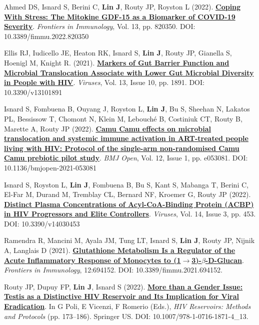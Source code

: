 \documentclass[letterpaper,11pt]{article}
\newcounter{journalCounter}
\newcommand{\jref}{%
    \stepcounter{journalCounter}%
    \textbf{[J.\thejournalCounter]}%
}
\begin{document}
\item[\jref] Ahmed DS, Isnard S, Berini C, \textbf{Lin J}, Routy JP, Royston L (2022). \href{https://doi.org/10.3389/fimmu.2022.820350}{\textbf{Coping With Stress: The Mitokine GDF-15 as a Biomarker of COVID-19 Severity}}. \textit{Frontiers in Immunology}, Vol. 13, pp. 820350. DOI: 10.3389/fimmu.2022.820350

\item[\jref] Ellis RJ, Iudicello JE, Heaton RK, Isnard S, \textbf{Lin J}, Routy JP, Gianella S, Hoenigl M, Knight R. (2021). \href{https://doi.org/10.3390/v13101891}{\textbf{Markers of Gut Barrier Function and Microbial Translocation Associate with Lower Gut Microbial Diversity in People with HIV}}. \textit{Viruses}, Vol. 13, Issue 10, pp. 1891. DOI: 10.3390/v13101891

\item[\jref] Isnard S, Fombuena B, Ouyang J, Royston L, \textbf{Lin J}, Bu S, Sheehan N, Lakatos PL, Bessissow T, Chomont N, Klein M, Lebouché B, Costiniuk CT, Routy B, Marette A, Routy JP (2022). \href{https://doi.org/10.1136/bmjopen-2021-053081}{\textbf{Camu Camu effects on microbial translocation and systemic immune activation in ART-treated people living with HIV: Protocol of the single-arm non-randomised Camu Camu prebiotic pilot study}}. \textit{BMJ Open}, Vol. 12, Issue 1, pp. e053081. DOI: 10.1136/bmjopen-2021-053081

\item[\jref] Isnard S, Royston L, \textbf{Lin J}, Fombuena B, Bu S, Kant S, Mabanga T, Berini C, El-Far M, Durand M, Tremblay CL, Bernard NF, Kroemer G, Routy JP (2022). \href{https://doi.org/10.3390/v14030453}{\textbf{Distinct Plasma Concentrations of Acyl-CoA-Binding Protein (ACBP) in HIV Progressors and Elite Controllers}}. \textit{Viruses}, Vol. 14, Issue 3, pp. 453. DOI: 10.3390/v14030453

\item[\jref] Ramendra R, Mancini M, Ayala JM, Tung LT, Isnard S, \textbf{Lin J}, Routy JP, Nijnik A, Langlais D (2021). \href{https://doi.org/10.3389/fimmu.2021.694152}{\textbf{Glutathione Metabolism Is a Regulator of the Acute Inflammatory Response of Monocytes to (1$\rightarrow$3)-$\beta$-D-Glucan}}. \textit{Frontiers in Immunology}, 12:694152. DOI: 10.3389/fimmu.2021.694152.

\item[\jref] Routy JP, Dupuy FP, \textbf{Lin J}, Isnard S (2022). \href{https://doi.org/10.1007/978-1-0716-1871-4_13}{\textbf{More than a Gender Issue: Testis as a Distinctive HIV Reservoir and Its Implication for Viral Eradication}}. In G Poli, E Vicenzi, F Romerio (Eds.), \textit{HIV Reservoirs: Methods and Protocols} (pp. 173–186). Springer US. DOI: 10.1007/978-1-0716-1871-4\_13.
\end{document}
